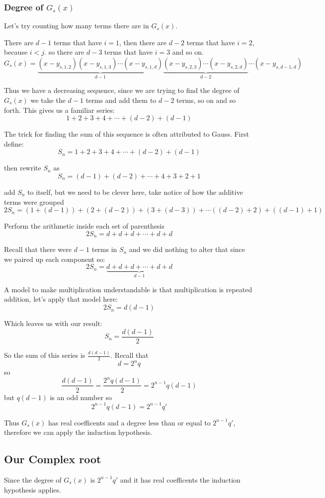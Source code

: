 \documentclass[12pt]{article}
\begin{document}
\subsubsection*{Degree of $G_s(x)$}
Let's try counting how many terms there are in $G_s(x)$.

There are $d-1$ terms that have $i=1$, then there are $d-2$ terms that have $i=2$, because $i<j$.  so there are $d-3$ terms that have $i=3$ and so on.
$$ G_s(x) =\underbrace{(x-y_{s,1,2})(x-y_{s,1,3})\cdots(x-y_{s,1,d})}_{d-1} \underbrace{(x-y_{s,2,3})\cdots (x-y_{s,2,d})}_{d-2} \cdots (x-y_{s,d-1,d})$$

Thus we have a decreasing sequence, since we are trying to find the degree of $G_s(x)$ we take the $d-1$ terms and add them to $d-2$ terms, so on and so forth.  This gives us a familiar series:
$$ 1 + 2 + 3 + 4 + \cdots + (d-2) + (d-1)$$

The trick for finding the sum of this sequence is often attributed to Gauss.
First define: $$S_n = 1 + 2 + 3 + 4 + \cdots + (d-2) + (d-1)$$

then rewrite $S_n$ as
$$S_n = (d-1) + (d-2) + \cdots + 4 + 3 + 2 + 1$$

add $S_n$ to itself, but we need to be clever here, take notice of how the additive terms were grouped
$$2 S_n = (1 + (d-1)) + (2+(d-2)) + (3 + (d-3)) + \cdots ((d-2) +2) + ((d-1)+1)$$

Perform the arithmetic inside each set of parenthesis
$$ 2 S_n = d + d + d + \cdots + d + d$$

Recall that there were $d-1$ terms in $S_n$ and we did nothing to alter that since we paired up each component so:
$$2 S_n = \underbrace{d + d + d + \cdots + d + d}_{d-1}$$

A model to make multiplication understandable is that multiplication is repeated addition, let's apply that model here:
$$2 S_n = d(d-1)$$

Which leaves us with our result:
$$S_n = \frac{d(d-1)}{2}$$


So the sum of this series is $\frac{d(d-1)}{2}$.  Recall that 
$$d=2^n q$$
 so 
 $$\frac{d(d-1)}{2} = \frac{2^n q (d-1)}{2} = 2^{n-1}q(d-1)$$
  but $q(d-1)$ is an odd number so 
  $$2^{n-1}q(d-1) = 2^{n-1}q'$$

Thus $G_s(x)$ has real coefficents and a degree less than or equal to $2^{n-1}q'$, therefore we can apply the induction hypothesis.

\subsection*{Our Complex root}
Since the degree of $G_s(x)$ is $2^{n-1}q'$ and it has real coefficents the  induction hypothesis applies.
\end{document}
